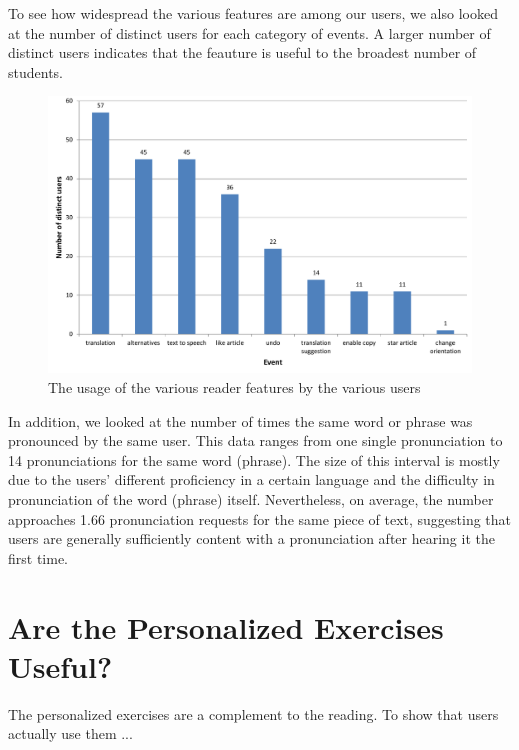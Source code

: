 To see how widespread the various features are among our users, we also looked at the number of distinct users for each category of events. A larger number of distinct users indicates that the feauture is useful to the broadest number of students.

\begin{figure}[h!]
\centering
  \includegraphics[width=0.7\columnwidth]{figures/reader_feature_usage_per_user}
  \caption{The usage of the various reader features by the various users }
\end{figure}

In addition, we looked at the number of times the same word or phrase was pronounced by the same user. This data ranges from one single pronunciation to 14 pronunciations for the same word (phrase). The size of this interval is mostly due to the users' different proficiency in a certain language and the difficulty in pronunciation of the word (phrase) itself. Nevertheless, on average, the number approaches 1.66 pronunciation requests for the same
piece of text, suggesting that users are generally sufficiently content with a pronunciation after hearing it the first time.



\section{Are the Personalized Exercises Useful?}

The personalized exercises are a complement to the reading. To show that 
users actually use them ... 

